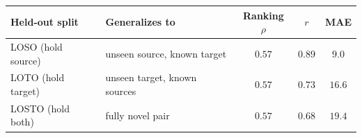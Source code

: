 \begin{tabular}{l l c c c}
\toprule
Held-out split & Generalizes to & Ranking $\rho$ & $r$ & MAE \\
\midrule
LOSO (hold source)  & unseen source, known target  & $0.57$ & $0.89$ & $9.0$ \\
LOTO (hold target)  & unseen target, known sources & $0.57$ & $0.73$ & $16.6$ \\
LOSTO (hold both)   & fully novel pair             & $0.57$ & $0.68$ & $19.4$ \\
\bottomrule
\end{tabular}
